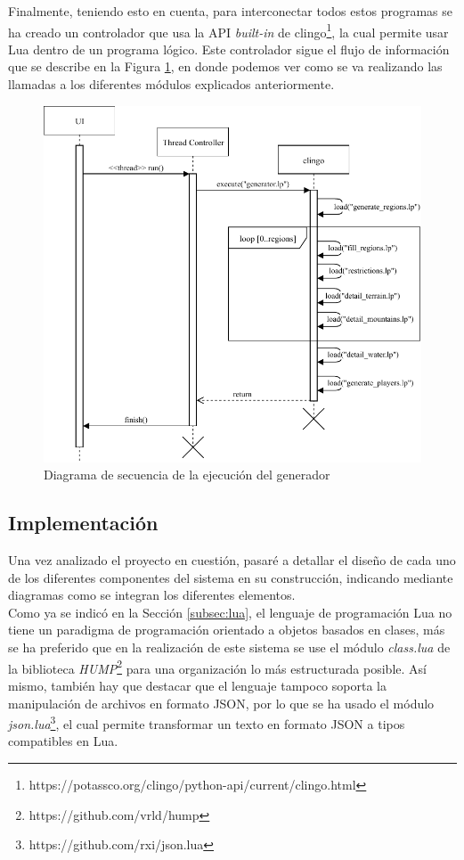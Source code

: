 Finalmente, teniendo esto en cuenta, para interconectar todos estos programas se ha creado un controlador que usa la API \textit{built-in} de clingo\footnote{https://potassco.org/clingo/python-api/current/clingo.html}, la cual permite usar Lua dentro de un programa lógico. Este controlador sigue el flujo de información que se describe en la Figura \ref{fig:sequence}, en donde podemos ver como se va realizando las llamadas a los diferentes módulos explicados anteriormente.

\begin{figure}[!h]
	\centering
	\includegraphics[width=\textwidth]{images/secuencia.pdf}
	\caption{Diagrama de secuencia de la ejecución del generador}
	\label{fig:sequence}
\end{figure}

\subsection{Implementación}
\label{subsec:implementacion}

Una vez analizado el proyecto en cuestión, pasaré a detallar el diseño de cada uno de los diferentes componentes del sistema en su construcción, indicando mediante diagramas como se integran los diferentes elementos. \\

Como ya se indicó en la Sección \ref{subsec:lua}, el lenguaje de programación Lua no tiene un paradigma de programación orientado a objetos basados en clases, más se ha preferido que en la realización de este sistema se use el módulo \textit{class.lua} de la biblioteca \textit{HUMP}\footnote{https://github.com/vrld/hump} para una organización lo más estructurada posible. Así mismo, también hay que destacar que el lenguaje tampoco soporta la manipulación de archivos en formato JSON, por lo que se ha usado el módulo \textit{json.lua}\footnote{https://github.com/rxi/json.lua}, el cual permite transformar un texto en formato JSON a tipos compatibles en Lua. \\

